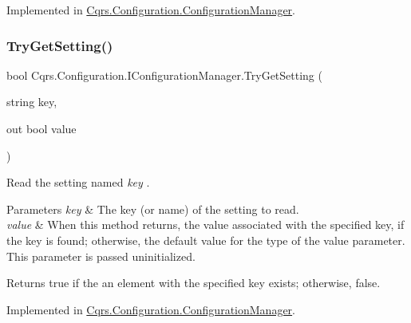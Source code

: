 Implemented in \hyperlink{classCqrs_1_1Configuration_1_1ConfigurationManager_ad87af2a011af065d6d3e0d2ff01c7f6e_ad87af2a011af065d6d3e0d2ff01c7f6e}{Cqrs.\+Configuration.\+Configuration\+Manager}.

\mbox{\label{interfaceCqrs_1_1Configuration_1_1IConfigurationManager_a8389181330999fcb8e30af4dbb56d35e_a8389181330999fcb8e30af4dbb56d35e}} 
\subsubsection{\texorpdfstring{Try\+Get\+Setting()}{TryGetSetting()}\hspace{0.1cm}{\footnotesize\ttfamily [2/2]}}
{\footnotesize\ttfamily bool Cqrs.\+Configuration.\+I\+Configuration\+Manager.\+Try\+Get\+Setting (\begin{DoxyParamCaption}\item[{string}]{key,  }\item[{out bool}]{value }\end{DoxyParamCaption})}



Read the setting named {\itshape key} . 


\begin{DoxyParams}{Parameters}
{\em key} & The key (or name) of the setting to read.\\
\hline
{\em value} & When this method returns, the value associated with the specified key, if the key is found; otherwise, the default value for the type of the value parameter. This parameter is passed uninitialized.\\
\hline
\end{DoxyParams}
\begin{DoxyReturn}{Returns}
true if the an element with the specified key exists; otherwise, false.
\end{DoxyReturn}


Implemented in \hyperlink{classCqrs_1_1Configuration_1_1ConfigurationManager_a40810d0b9fd2f3d1c4a270681e908c84_a40810d0b9fd2f3d1c4a270681e908c84}{Cqrs.\+Configuration.\+Configuration\+Manager}.

